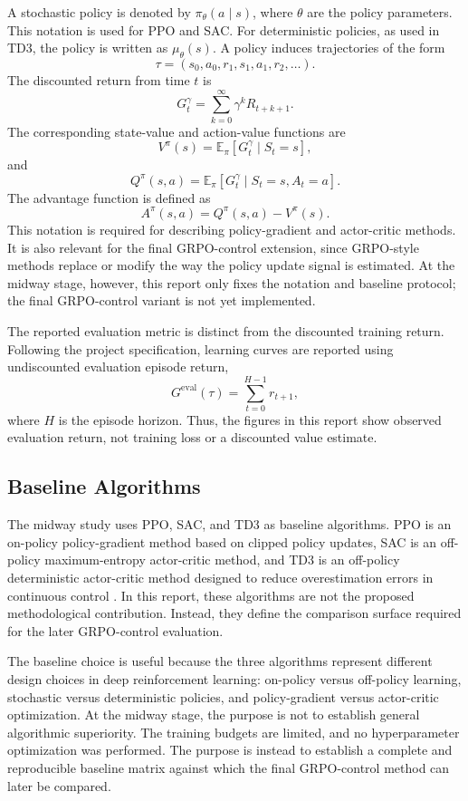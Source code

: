 A stochastic policy is denoted by $\pi_\theta(a \mid s)$, where $\theta$ are the policy parameters. This notation is used for PPO and SAC. For deterministic policies, as used in TD3, the policy is written as $\mu_\theta(s)$. A policy induces trajectories of the form
\[
\tau = (s_0,a_0,r_1,s_1,a_1,r_2,\ldots).
\]
The discounted return from time $t$ is
\[
G_t^\gamma
=
\sum_{k=0}^{\infty} \gamma^k R_{t+k+1}.
\]
The corresponding state-value and action-value functions are
\[
V^\pi(s)
=
\mathbb{E}_{\pi}
\left[
G_t^\gamma \mid S_t=s
\right],
\]
and
\[
Q^\pi(s,a)
=
\mathbb{E}_{\pi}
\left[
G_t^\gamma \mid S_t=s, A_t=a
\right].
\]
The advantage function is defined as
\[
A^\pi(s,a)
=
Q^\pi(s,a)-V^\pi(s).
\]
This notation is required for describing policy-gradient and actor-critic methods. It is also relevant for the final GRPO-control extension, since GRPO-style methods replace or modify the way the policy update signal is estimated. At the midway stage, however, this report only fixes the notation and baseline protocol; the final GRPO-control variant is not yet implemented.

The reported evaluation metric is distinct from the discounted training return. Following the project specification, learning curves are reported using undiscounted evaluation episode return,
\[
G^{\mathrm{eval}}(\tau)
=
\sum_{t=0}^{H-1} r_{t+1},
\]
where $H$ is the episode horizon. Thus, the figures in this report show observed evaluation return, not training loss or a discounted value estimate.

\subsection{Baseline Algorithms}
\label{sec:methodology-baselines}

The midway study uses PPO, SAC, and TD3 as baseline algorithms. PPO is an on-policy policy-gradient method based on clipped policy updates, SAC is an off-policy maximum-entropy actor-critic method, and TD3 is an off-policy deterministic actor-critic method designed to reduce overestimation errors in continuous control \citep{schulman2017proximal,haarnoja2018soft,fujimoto2018addressing}. In this report, these algorithms are not the proposed methodological contribution. Instead, they define the comparison surface required for the later GRPO-control evaluation.

The baseline choice is useful because the three algorithms represent different design choices in deep reinforcement learning: on-policy versus off-policy learning, stochastic versus deterministic policies, and policy-gradient versus actor-critic optimization. At the midway stage, the purpose is not to establish general algorithmic superiority. The training budgets are limited, and no hyperparameter optimization was performed. The purpose is instead to establish a complete and reproducible baseline matrix against which the final GRPO-control method can later be compared.

